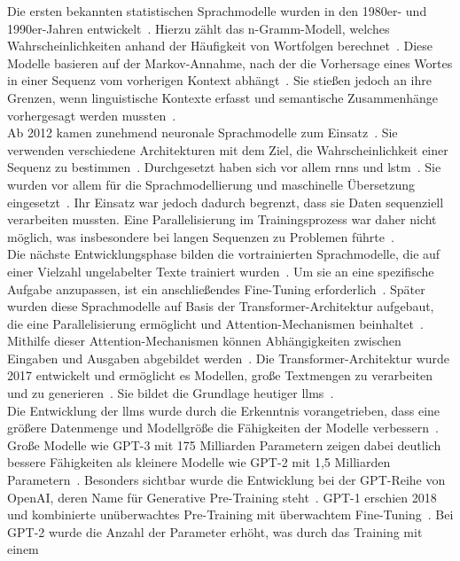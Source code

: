 Die ersten bekannten statistischen Sprachmodelle wurden in den 1980er- und 1990er-Jahren entwickelt~\cite[2968]{cb01}. Hierzu zählt das n-Gramm-Modell, welches 
Wahrscheinlichkeiten anhand der Häufigkeit von Wortfolgen berechnet~\cite[2968]{cb01}. Diese Modelle basieren auf der Markov-Annahme, nach der die Vorhersage
eines Wortes in einer Sequenz vom vorherigen Kontext abhängt~\cite[2976]{cb01}. Sie stießen jedoch an ihre Grenzen, wenn linguistische Kontexte erfasst und 
semantische Zusammenhänge vorhergesagt werden mussten~\cite[2976]{cb01}. \\
Ab 2012 kamen zunehmend neuronale Sprachmodelle zum Einsatz~\cite[2970]{cb01}. Sie verwenden verschiedene Architekturen mit dem Ziel, die Wahrscheinlichkeit einer 
Sequenz zu bestimmen~\cite[2977]{cb01}. Durchgesetzt haben sich vor allem \acp{rnn} und \ac{lstm}~\cite[2]{llm06}. Sie wurden vor allem für die
Sprachmodellierung und maschinelle Übersetzung eingesetzt~\cite[2]{llm06}. Ihr Einsatz war jedoch dadurch begrenzt, dass sie Daten sequenziell verarbeiten mussten.
Eine Parallelisierung im Trainingsprozess war daher nicht möglich, was insbesondere bei langen Sequenzen zu Problemen führte~\cite[2]{llm06}. \\
Die nächste Entwicklungsphase bilden die vortrainierten Sprachmodelle, die auf einer Vielzahl ungelabelter Texte trainiert wurden~\cite[2977]{cb01}. Um sie an eine
spezifische Aufgabe anzupassen, ist ein anschließendes Fine-Tuning erforderlich~\cite[2977]{cb01}. Später wurden diese Sprachmodelle auf Basis der 
Transformer-Architektur aufgebaut, die eine Parallelisierung ermöglicht und Attention-Mechanismen beinhaltet~\cite[2]{llm09}. Mithilfe dieser 
Attention-Mechanismen können Abhängigkeiten zwischen Eingaben und Ausgaben abgebildet werden~\cite[2]{llm06}. Die Transformer-Architektur wurde 2017 entwickelt 
und ermöglicht es Modellen, große Textmengen zu verarbeiten und zu generieren~\cite[378]{llm01}. Sie bildet die Grundlage heutiger \acp{llm}~\cite[95]{llm02}. \\
Die Entwicklung der \acp{llm} wurde durch die Erkenntnis vorangetrieben, dass eine größere Datenmenge und Modellgröße die Fähigkeiten der Modelle verbessern~\cite[2\psq]{llm09}.
Große Modelle wie GPT-3 mit 175 Milliarden Parametern zeigen dabei deutlich bessere Fähigkeiten als kleinere Modelle wie GPT-2 mit 1,5 Milliarden
Parametern~\cite[2\psq]{llm09}.
Besonders sichtbar wurde die Entwicklung bei der GPT-Reihe von OpenAI, deren Name für Generative Pre-Training steht~\cite[7]{llm09}. GPT-1 erschien 2018 und 
kombinierte unüberwachtes Pre-Training mit überwachtem Fine-Tuning~\cite[7]{llm09}. Bei GPT-2 wurde die Anzahl der Parameter erhöht, was durch das Training mit einem
